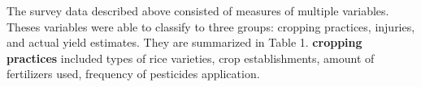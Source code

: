 The survey data described above consisted of measures of multiple variables. Theses variables were able to classify to three groups: cropping practices, injuries, and actual yield estimates. They are summarized in Table 1. \textbf{cropping practices} included types of rice varieties, crop establishments, amount of fertilizers used, frequency of pesticides application. %


